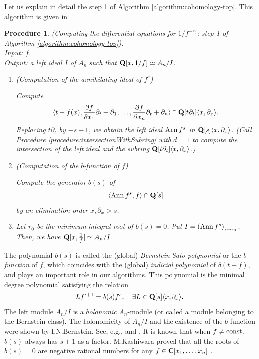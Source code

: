 \documentclass[12pt]{article}
\def\Ann{ {\rm Ann}\, }
\def\pd#1{ \partial_{#1} }
\def\C{{\bf C}}
\def\Q{{\bf Q}}
\newtheorem{procedure}[theorem]{Procedure}
\begin{document}
Let us explain in detail the step 1 of Algorithm 
\ref{algorithm:cohomology-top}.
This algorithm is given in \cite{OakuMEGA96}

\begin{procedure} \rm \label{procedure:annihilator}
(Computing the differential equations for $1/f^{-r_0}$;
step 1 of Algorithm \ref{algorithm:cohomology-top}). \\

\noindent
Input: $f$. \\
Output: a left ideal $I$ of $A_n$ such that $\Q[x,1/f] \simeq A_n/I$.

\begin{enumerate}
\item (Computation of the annihilating ideal of $f^s$) 

Compute
$$
\langle t-f(x), {{\partial f} \over
                 {\partial x_1}} \pd{t} + \pd{1}, \ldots,
                {{\partial f} \over
                 {\partial x_n}} \pd{t} + \pd{n} \rangle \cap
\Q[ t \pd{t}]\langle x, \pd{x}\rangle.
$$
Replacing $t \pd{t}$ by $-s-1$, we obtain the left ideal
$ \Ann f^s  $ in $\Q[s]\langle x, \pd{x} \rangle$.
(Call Procedure \ref{procedure:intersectionWithSubring} with $d=1$ 
to compute the intersection
of the left ideal and the subring $\Q[t \pd{t}] \langle x, \pd{x}\rangle$.)

\item (Computation of the $b$-function of $f$)

Compute the generator $b(s)$ of
$$  \langle \Ann f^s, f \rangle \cap \Q[s] $$
by an elimination order $ x, \pd{x} > s $.
\item
Let $r_0$ be the minimum integral root of $b(s)=0$.
Put $I = (\Ann f^s)_{_{ s \rightarrow r_0}}$.
Then, we have $\Q[x,{1 \over f}] \simeq A_n/I$.
\end{enumerate}
\end{procedure}

The polynomial $b(s)$ is called the (global) 
{\it Bernstein-Sato polynomial} or the {\it $b$-function} of $f$, which 
coincides with the (global) {\it indicial polynomial} of $\delta(t-f)$,
and plays an important role in our algorithms.
This polynomial is the minimal degree polynomial satisfying the relation
$$  L f^{s+1} = b(s) f^s, \quad \exists L \in \Q[s]\langle x, \pd{x} \rangle.
$$
The left module $A_n/I$ is a {\it holonomic} $A_n$-module 
(or called  a module belonging to the Bernstein class).
The holonomicity of $A_n/I$ and the existence of the $b$-function
were shown by I.N.Bernstein.
See, e.g., \cite{Bernstein} and \cite[p.13, 5.5 Theorem]{BjorkBook}.
It is known that when $f \not= {\rm const}$, $b(s)$ always 
has $s+1$ as a factor.
M.Kashiwara proved that
all the roots of $b(s) = 0$ are negative rational numbers
for any $f \in \C[x_1, \ldots, x_n]$ \cite{KashiwaraBfunction}.
\end{document}
